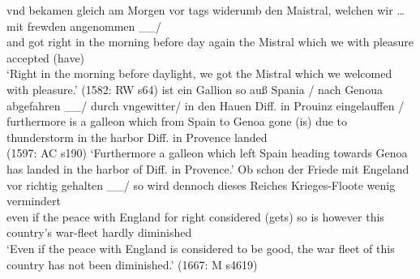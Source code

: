 \documentclass[output=paper,colorlinks,citecolor=brown]{langscibook}
\begin{document}
\eal
\ex\label{ex-Mistral}
\gll vnd bekamen gleich am Morgen vor tags widerumb den Maistral, welchen wir \dots {} mit frewden angenommen \_\_/ \\ and got right {in the} morning before day again the Mistral which we {} with pleasure accepted (have)   \\ 
\glt `Right in the morning before daylight, we got the Mistral which we welcomed with pleasure.' \hfill  (1582: RW s64)
\ex
{} ist ein Gallion so auß Spania / nach Genoua abgefahren \_\_/ durch vngewitter/ in den Hauen Diff. in Prouinz eingelauffen / \\ furthermore is a galleon which from Spain {} to Genoa gone (is) {due to} thunderstorm in the harbor Diff. in Provence landed  \\   \hfill (1597: AC s190)
\glt `Furthermore a galleon which left Spain heading towards Genoa has landed in the harbor of Diff. in Provence.'
\ex
\gll Ob schon der Friede mit Engeland vor richtig gehalten  \_\_/ so wird dennoch dieses Reiches Krieges-Floote wenig vermindert \\ even if the peace with England for right considered (gets) so is however this country's war-fleet hardly diminished  \\ 
\glt `Even if the peace with England is considered to be good, the war fleet of this country has not been diminished.' \hfill (1667: M s4619)
\zl
\end{document}
